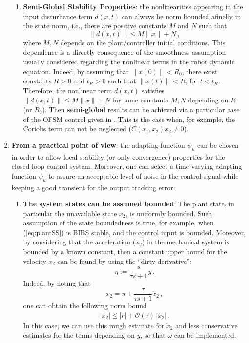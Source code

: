 \documentclass[letterpaper, 10 pt, journal, twocolumn]{IEEEtran}  %
\theoremstyle{plain}
\theoremstyle{definition}
\theoremstyle{remark}
\begin{document}
\begin{enumerate}
\begin{enumerate}
\item {\bf Semi-Global Stability Properties}: the nonlinearities appearing in the input disturbance term $d(x,t)$ can always be norm bounded afinelly in the state norm, i.e., there are positive constants $M$ and $N$ such that 
%
$$\|d(x,t)\| \leq M \|x\| + N\,,$$
%
where $M, N$ depends on the plant/controller initial conditions. This dependence is a directly consequence of the smoothness assumption usually considered regarding the nonlinear terms in the robot dynamic equation. Indeed, by assuming that $\|x(0)\| < R_0$, there exist constants $R>0$ and $t_R>0$ such that  $\|x(t)\| < R$, for $t<t_R$. Therefore, the nonlinear term $d(x,t)$ satisfies $\|d(x,t)\| \leq M \|x\| + N$ for some constants $M, N$ depending on $R$ (or $R_0$). Then {\bf semi-global} results can be achieved via a particular case of the OFSM control given in \cite{POH:2011}. This is the case  when, for example, the Coriolis term can not be neglected ($C(x_1,x_2) x_2 \neq 0$).

\end{enumerate}


\item {\bf From a practical point of view}: the adapting function $\psi_\mu$ can be chosen in order to allow local stability (or only convergence) properties for the closed-loop control system. Moreover, one can select a time-varying adapting function $\psi_\mu$ to assure an acceptable level of noise in the control signal while keeping a good transient for the output tracking error. 

\begin{enumerate}


\item {\bf The system states can be assumed bounded}: The plant state, in particular the unavailable state $x_2$, is uniformly bounded. Such assumption of the state boundedness is true, for example, when (\ref{eq:plantSS}) is BIBS stable, and the control input is bounded. Moreover, by considering that the acceleration ($\dot{x}_2$) in the mechanical system is bounded by a known constant, then a constant  upper bound for the velocity $x_2$ can be found by using the ``dirty derivative'':
%
\begin{equation}
\eta := \frac{s}{\tau s+1} y\,.
\end{equation}
%
Indeed, by noting that 
%
\begin{equation}
x_2=\eta + \frac{\tau}{\tau s+1} \dot{x}_2\,,
\end{equation}
%
one can obtain the following norm bound  
%
\begin{align}
	|x_2| \leq |\eta| + \mathcal{O}(\tau) \, |\dot{x}_2| \, .
\end{align}
%
In this case, we can use this rough estimate for $\dot{x}_2$ and less conservative estimates for the terms depending on $y$, so that $\omega$ can be implemented.



\end{enumerate}
\end{enumerate}
\end{document}
